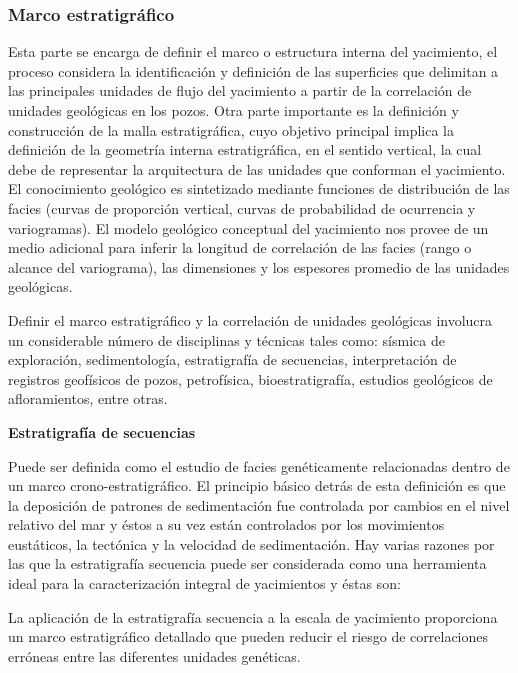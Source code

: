 \subsubsection{Marco estratigr\'afico}

Esta parte se encarga de definir el marco o estructura interna del yacimiento, el proceso considera la identificaci\'on y definici\'on de las superficies que delimitan a las principales unidades de flujo del yacimiento a partir de la correlaci\'on de unidades geol\'ogicas en los pozos. Otra parte importante es la definici\'on y construcci\'on de la malla estratigr\'afica, cuyo objetivo principal implica la definici\'on de la geometr\'ia interna estratigr\'afica, en el sentido vertical, la cual debe de representar la arquitectura de las unidades que conforman el yacimiento. El conocimiento geol\'ogico es sintetizado mediante funciones de distribuci\'on de las facies (curvas de proporci\'on vertical, curvas de probabilidad de ocurrencia y variogramas). El modelo geol\'ogico conceptual del yacimiento nos provee de un medio adicional para inferir la longitud de correlaci\'on de las facies (rango o alcance del variograma), las dimensiones y los espesores promedio de las unidades geol\'ogicas.

Definir el marco estratigr\'afico y la correlaci\'on de unidades geol\'ogicas involucra un considerable n\'umero de disciplinas y t\'ecnicas tales como: s\'ismica de exploraci\'on, sedimentolog\'ia, estratigraf\'ia de secuencias, interpretaci\'on de registros geof\'isicos de pozos, petrof\'isica, bioestratigraf\'ia, estudios geol\'ogicos de afloramientos, entre otras.

\textbf{Estratigraf\'ia de secuencias}

Puede ser definida como el estudio de facies gen\'eticamente relacionadas dentro de un marco crono-estratigr\'afico. El principio b\'asico detr\'as de esta definici\'on es que la deposici\'on de patrones de sedimentaci\'on fue controlada por cambios en el nivel relativo del mar y \'estos a su vez est\'an controlados por los movimientos eust\'aticos, la tect\'onica y la velocidad de sedimentaci\'on. Hay varias razones por las que la estratigraf\'ia secuencia puede ser considerada como una herramienta ideal para la caracterizaci\'on integral de yacimientos y \'estas son:

La aplicaci\'on de la estratigraf\'ia secuencia a la escala de yacimiento proporciona un marco estratigr\'afico detallado que pueden reducir el riesgo de correlaciones err\'oneas entre las diferentes unidades gen\'eticas.

